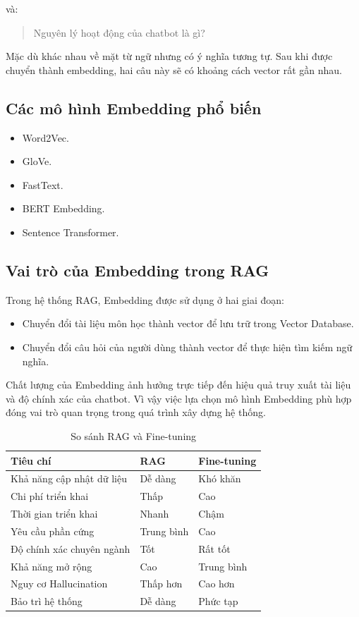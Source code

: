 \documentclass[12pt,a4paper]{report}
\begin{document}
	và:
	
	\begin{quote}
		Nguyên lý hoạt động của chatbot là gì?
	\end{quote}
	
	Mặc dù khác nhau về mặt từ ngữ nhưng có ý nghĩa tương tự. Sau khi được chuyển thành embedding, hai câu này sẽ có khoảng cách vector rất gần nhau.
	
	\subsection{Các mô hình Embedding phổ biến}
	
	\begin{itemize}
		\item Word2Vec.
		\item GloVe.
		\item FastText.
		\item BERT Embedding.
		\item Sentence Transformer.
	\end{itemize}
	
	\subsection{Vai trò của Embedding trong RAG}
	
	Trong hệ thống RAG, Embedding được sử dụng ở hai giai đoạn:
	
	\begin{itemize}
		\item Chuyển đổi tài liệu môn học thành vector để lưu trữ trong Vector Database.
		\item Chuyển đổi câu hỏi của người dùng thành vector để thực hiện tìm kiếm ngữ nghĩa.
	\end{itemize}
	
	Chất lượng của Embedding ảnh hưởng trực tiếp đến hiệu quả truy xuất tài liệu và độ chính xác của chatbot. Vì vậy việc lựa chọn mô hình Embedding phù hợp đóng vai trò quan trọng trong quá trình xây dựng hệ thống.
	\begin{table}[H]
		\centering
		\caption{So sánh RAG và Fine-tuning}
		\begin{tabular}{|p{4cm}|p{5cm}|p{5cm}|}
			\hline
			Tiêu chí & RAG & Fine-tuning \\
			\hline
			Khả năng cập nhật dữ liệu & Dễ dàng & Khó khăn \\
			\hline
			Chi phí triển khai & Thấp & Cao \\
			\hline
			Thời gian triển khai & Nhanh & Chậm \\
			\hline
			Yêu cầu phần cứng & Trung bình & Cao \\
			\hline
			Độ chính xác chuyên ngành & Tốt & Rất tốt \\
			\hline
			Khả năng mở rộng & Cao & Trung bình \\
			\hline
			Nguy cơ Hallucination & Thấp hơn & Cao hơn \\
			\hline
			Bảo trì hệ thống & Dễ dàng & Phức tạp \\
			\hline
		\end{tabular}
	\end{table}
\end{document}
